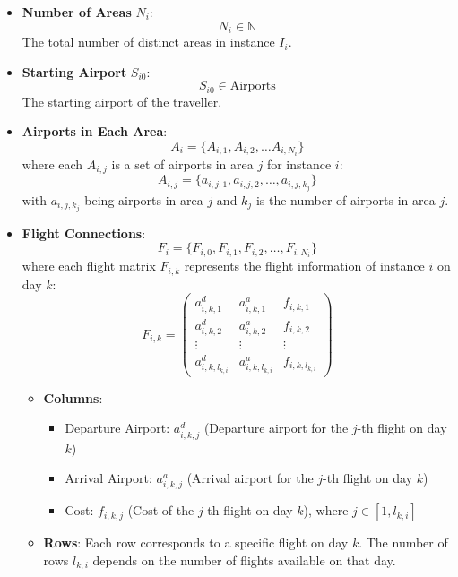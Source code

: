 \begin{itemize}
    \item \textbf{Number of Areas} \(N_i\):
          \[
              N_i \in \mathbb{N}
          \]
          The total number of distinct areas in instance \(I_i\).

    \item \textbf{Starting Airport} \(S_{i0}\):
          \[
              S_{i0} \in \text{Airports}
          \]
          The starting airport of the traveller.

    \item \textbf{Airports in Each Area}:
          \[A_{i}=
              \{A_{i,1}, A_{i,2}, \ldots A_{i,{N_i}}\}
          \]
          where each \(A_{i,j}\) is a set of airports in area \(j\) for instance \(i\):
          \[
              A_{i,j} = \{ a_{i,j,1}, a_{i,j,2}, \ldots, a_{i,j,k_j} \}
          \]
          with \( a_{i,j,k_j} \) being airports in area \(j\) and \(k_j\) is the number of airports in area \(j\).

    \item \textbf{Flight Connections}:
          \[F_{i}=
              \{F_{i,0},F_{i,1}, F_{i,2}, \ldots, F_{i,N_i}\}
          \]
          where each flight matrix \( F_{i,k} \) represents the flight information of instance $i$ on day \(k\):
          \[
              F_{i,k} = \begin{pmatrix}
                  a_{i,k,1}^d       & a_{i,k,1}^a       & f_{i,k,1}       \\
                  a_{i,k,2}^d       & a_{i,k,2}^a       & f_{i,k,2}       \\
                  \vdots            & \vdots            & \vdots          \\
                  a_{i,k,l_{k,i}}^d & a_{i,k,l_{k,i}}^a & f_{i,k,l_{k,i}}
              \end{pmatrix}
          \]

          \begin{itemize}
              \item \textbf{Columns}:
                    \begin{itemize}
                        \item Departure Airport: \( a_{i,k,j}^d \) (Departure airport for the \(j\)-th flight on day \(k\))
                        \item Arrival Airport: \( a_{i,k,j}^a \) (Arrival airport for the \(j\)-th flight on day \(k\))
                        \item Cost: \( f_{i,k,j} \) (Cost of the \(j\)-th flight on day \(k\)), where \( j \in [1, l_{k,i}] \)
                    \end{itemize}
              \item \textbf{Rows}:
                    Each row corresponds to a specific flight on day \(k\). The number of rows \(l_{k,i}\) depends on the number of flights available on that day.
          \end{itemize}

\end{itemize}


